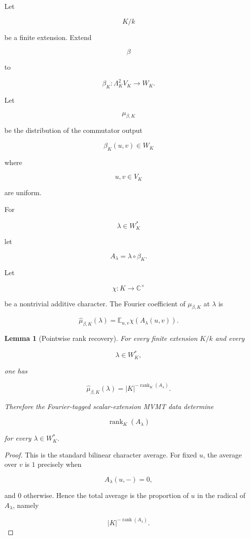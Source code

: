 \documentclass[11pt]{article}
\newtheorem{lemma}[theorem]{Lemma}
\begin{document}
Let

\[
K/k
\]

be a finite extension. Extend

\[
\beta
\]

to

\[
\beta_K:\Lambda^2_KV_K\to W_K.
\]

Let

\[
\mu_{\beta,K}
\]

be the distribution of the commutator output

\[
\beta_K(u,v)\in W_K
\]

where

\[
u,v\in V_K
\]

are uniform.

For

\[
\lambda\in W_K^*
\]

let

\[
A_\lambda=\lambda\circ\beta_K.
\]

Let

\[
\chi:K\to\mathbb C^\times
\]

be a nontrivial additive character. The Fourier coefficient of $\mu_{\beta,K}$ at $\lambda$ is

\[
\widehat\mu_{\beta,K}(\lambda)
=
\mathbb E_{u,v}
\chi(A_\lambda(u,v)).
\]

\begin{lemma}[Pointwise rank recovery]

For every finite extension $K/k$ and every

\[
\lambda\in W_K^*,
\]

one has

\[
\boxed{
\widehat\mu_{\beta,K}(\lambda)
=
|K|^{-\operatorname{rank}_K(A_\lambda)}.
}
\]

Therefore the Fourier-tagged scalar-extension MVMT data determine

\[
\operatorname{rank}_K(A_\lambda)
\]

for every $\lambda\in W_K^*$.

\end{lemma}

\begin{proof}

This is the standard bilinear character average. For fixed $u$, the average over $v$ is $1$ precisely when

\[
A_\lambda(u,-)=0,
\]

and $0$ otherwise. Hence the total average is the proportion of $u$ in the radical of $A_\lambda$, namely

\[
|K|^{-\operatorname{rank}(A_\lambda)}.
\]

\end{proof}
\end{document}
